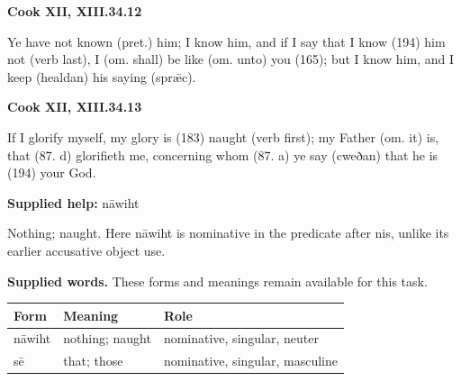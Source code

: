 \par\begin{minipage}{\linewidth}\raggedright
\textbf{Cook XII, XIII.34.12}

Ye have not known (pret.) him; I know him, and if I say that I know (194) him not (verb last), I (om. shall) be like (om. unto) you (165); but I know him, and I keep (healdan) his saying (sprǣc).

\end{minipage}\par\addvspace{4pt}

\par\begin{minipage}{\linewidth}\raggedright
\textbf{Cook XII, XIII.34.13}

If I glorify myself, my glory is (183) naught (verb first); my Father (om. it) is, that (87. d) glorifieth me, concerning whom (87. a) ye say (cweðan) that he is (194) your God.

\textbf{Supplied help:} nāwiht

Nothing; naught. Here nāwiht is nominative in the predicate after nis, unlike its earlier accusative object use.

\end{minipage}\par\addvspace{4pt}

\textbf{Supplied words.} These forms and meanings remain available for this task.

\par\begingroup
\fontsize{10.5}{13.2}\selectfont
\setlength{\LTleft}{0pt}\setlength{\LTright}{\fill}
\noindent
\begin{tabular}{@{}>{\raggedright\arraybackslash}p{28.77mm}>{\raggedright\arraybackslash}p{32.08mm}>{\raggedright\arraybackslash}p{57.53mm}@{}}
\toprule
\textbf{Form} & \textbf{Meaning} & \textbf{Role} \\
\midrule
nāwiht & nothing; naught & nominative, singular, neuter \\
sē & that; those & nominative, singular, masculine \\
\bottomrule
\end{tabular}
\par\endgroup

